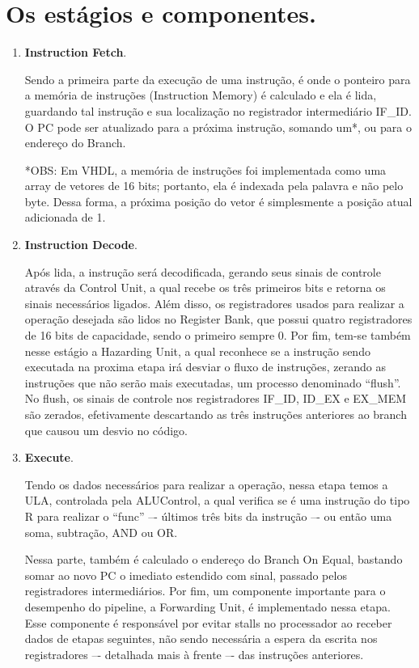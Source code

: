 \documentclass[a4paper, 11pt]{article}
\begin{document}
\section{Os estágios e componentes.}
\begin{enumerate}
    \item \textbf{Instruction Fetch}.

    Sendo a primeira parte da execução de uma instrução, é onde o ponteiro para a
    memória de instruções (Instruction Memory) é calculado e ela é lida, guardando
    tal instrução e sua localização no registrador intermediário IF\_ID. O PC pode
    ser atualizado para a próxima instrução, somando um*, ou para o endereço do Branch.

    *OBS: Em VHDL, a memória de instruções foi implementada como uma array de vetores
    de 16 bits; portanto, ela é indexada pela palavra e não pelo byte. Dessa forma,
    a próxima posição do vetor é simplesmente a posição atual adicionada de 1.

    \item \textbf{Instruction Decode}.

    Após lida, a instrução será decodificada, gerando seus sinais de controle através
    da Control Unit, a qual recebe os três primeiros bits e retorna os sinais necessários
    ligados. Além disso, os registradores usados para realizar a operação desejada são
    lidos no Register Bank, que possui quatro registradores de 16 bits de capacidade,
    sendo o primeiro sempre 0. Por fim, tem-se também nesse estágio a Hazarding Unit,
    a qual reconhece se a instrução sendo executada na proxima etapa irá desviar o fluxo
    de instruções, zerando as instruções que não serão mais executadas, um processo
    denominado “flush”. No flush, os sinais de controle nos registradores IF\_ID,
    ID\_EX e EX\_MEM são zerados, efetivamente descartando as três instruções anteriores
    ao branch que causou um desvio no código.

    \item \textbf{Execute}.

    Tendo os dados necessários para realizar a operação, nessa etapa temos a ULA,
    controlada pela ALUControl, a qual verifica se é uma instrução do tipo R para
    realizar o “func” –- últimos três bits da instrução –- ou então uma soma,
    subtração, AND ou OR.

    Nessa parte, também é calculado o endereço do Branch On Equal, bastando somar ao
    novo PC o imediato estendido com sinal, passado pelos registradores intermediários.
    Por fim, um componente importante para o desempenho do pipeline, a Forwarding Unit,
    é implementado nessa etapa. Esse componente é responsável por evitar stalls no
    processador ao receber dados de etapas seguintes, não sendo necessária a espera da
    escrita nos registradores –- detalhada mais à frente –- das instruções anteriores.


\end{enumerate}
\end{document}
